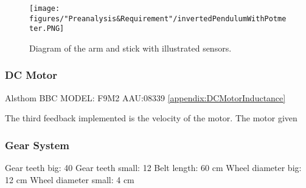 \begin{figure} [htbp]
	\centering
	\texttt{[image: figures/"Preanalysis\&Requirement"/invertedPendulumWithPotmeter.PNG]}
	\caption{Diagram of the arm and stick with illustrated sensors.} \label{fig:InvertedPendulumSetUpPotmeter}
\end{figure}
\newline


\subsubsection{DC Motor}
Alsthom BBC MODEL: F9M2 AAU:08339
\ref{appendix:DCMotorInductance}

The third feedback implemented is the velocity of the motor. The motor given  

\subsubsection{Gear System}
Gear teeth big: 40
Gear teeth small: 12
Belt length: 60 cm
Wheel diameter big: 12 cm
Wheel diameter small: 4 cm

